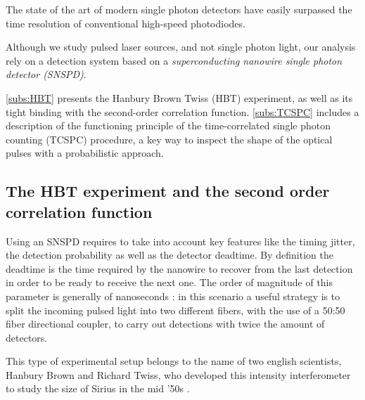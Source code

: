 The state of the art of modern single photon detectors have easily surpassed the time resolution of conventional high-speed photodiodes.

Although we study pulsed laser sources, and not single photon light, our analysis rely on a detection system based on a \emph{superconducting nanowire single photon detector (SNSPD)}.

\autoref{subs:HBT} presents the Hanbury Brown Twiss (HBT) experiment, as well as its tight binding with the second-order correlation function.
\autoref{subs:TCSPC} includes a description of the functioning principle of the time-correlated single photon counting (TCSPC) procedure, a key way to inspect the shape of the optical pulses with a probabilistic approach.






\subsection{The HBT experiment and the second order correlation function}
\label{subs:HBT}
Using an SNSPD requires to take into account key features like the timing jitter, the detection probability as well as the detector deadtime.
By definition the deadtime is the time required by the nanowire to recover from the last detection in order to be ready to receive the next one. 
The order of magnitude of this parameter is generally of nanoseconds : in this scenario a useful strategy is to split the incoming pulsed light into two different fibers, with the use of a 50:50 fiber directional coupler, to carry out detections with twice the amount of detectors.

This type of experimental setup belongs to the name of two english scientists, Hanbury Brown and Richard Twiss, who developed this intensity interferometer to study the size of Sirius in the mid '50s \cite{1956Natur.178.1046H}.

